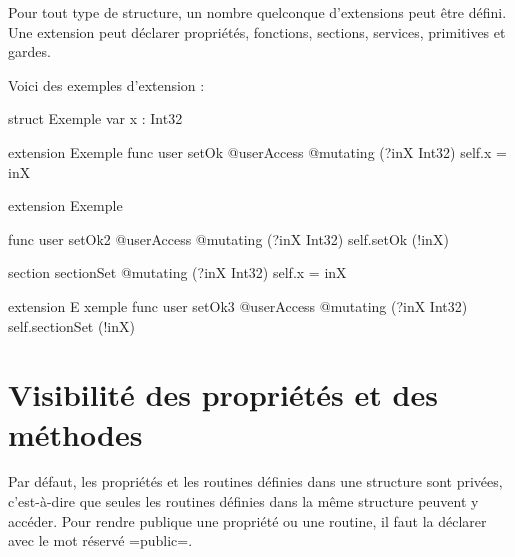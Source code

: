 Pour tout type de structure, un nombre quelconque d'extensions peut être défini. Une extension peut déclarer propriétés, fonctions, sections, services, primitives et gardes.

Voici des exemples d'extension :

\begin{PLM}
struct Exemple {
  var x : Int32
}

extension Exemple {
  func user setOk @userAccess @mutating (?inX Int32) {
    self.x = inX
  }
}

extension Exemple {
  func user setOk2 @userAccess @mutating (?inX Int32) {
    self.setOk (!inX) 
  }
  
  section sectionSet @mutating (?inX Int32) {
    self.x = inX
  }
}

extension E xemple {
  func user setOk3 @userAccess @mutating (?inX Int32) {
    self.sectionSet (!inX)
  }
}
\end{PLM}






\section{Visibilité des propriétés et des méthodes}

Par défaut, les propriétés et les routines définies dans une structure sont privées, c'est-à-dire que seules les routines définies dans la même structure peuvent y accéder. Pour rendre publique une propriété ou une routine, il faut la déclarer avec le mot réservé \plm=public=.


